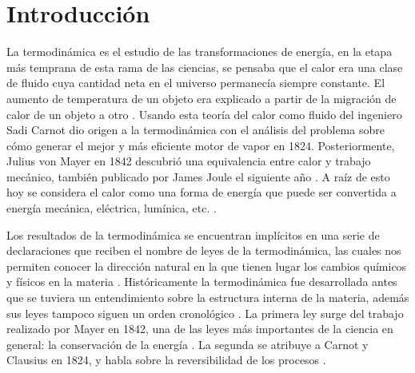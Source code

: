 
%


\newcommand{\keyword}[1]{\textit{#1}}


\section{Introducción}
	La termodinámica es el estudio de las transformaciones de energía, en la etapa más temprana de esta rama de las ciencias, se pensaba que el calor era una clase de fluido cuya cantidad neta en el universo permanecía siempre constante. El aumento de temperatura de un objeto era explicado a partir de la migración de calor de un objeto a otro \cite{feynman2011feynman, fermi1986}. Usando esta teoría del calor como fluido del ingeniero Sadi Carnot dio origen a la termodinámica con el análisis del problema sobre cómo generar el mejor y más eficiente motor de vapor en 1824. Posteriormente, Julius von Mayer en 1842 descubrió una equivalencia entre calor y trabajo mecánico, también publicado por James Joule el siguiente año \cite{fermi1986}. A raíz de esto hoy se considera el calor como una forma de energía que puede ser convertida a energía mecánica, eléctrica, lumínica, etc. \cite{fermi1986}.
	
	Los resultados de la termodinámica se encuentran implícitos en una serie de declaraciones que reciben el nombre de leyes de la termodinámica, las cuales nos permiten conocer la dirección natural en la que tienen lugar los cambios químicos y físicos en la materia \cite{atkins2011physical}. Históricamente la termodinámica fue desarrollada antes que se tuviera un entendimiento sobre la estructura interna de la materia, además sus leyes tampoco siguen un orden cronológico \cite{feynman2011feynman}. La primera ley surge del trabajo realizado por Mayer en 1842, una de las leyes más importantes de la ciencia en general: la conservación de la energía \cite{feynman2011feynman, fermi1986}. La segunda se atribuye a Carnot y Clausius en 1824, y habla sobre la reversibilidad de los procesos \cite{feynman2011feynman}.
	
